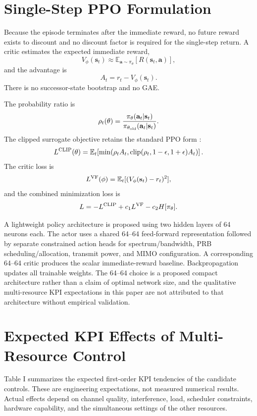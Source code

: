 \documentclass[conference]{IEEEtran}
\begin{document}
\section{Single-Step PPO Formulation}
Because the episode terminates after the immediate reward, no future reward exists to discount and no discount factor is required for the single-step return. A critic estimates the expected immediate reward,
\begin{equation}
V_\phi(\mathbf{s}_t)\approx
\mathbb{E}_{\mathbf{a}\sim\pi_\theta}
[R(\mathbf{s}_t,\mathbf{a})],
\end{equation}
and the advantage is
\begin{equation}
A_t=r_t-V_\phi(\mathbf{s}_t).
\end{equation}
There is no successor-state bootstrap and no GAE.

The probability ratio is
\begin{equation}
\rho_t(\theta)=
\frac{\pi_\theta(\mathbf{a}_t|\mathbf{s}_t)}
{\pi_{\theta_{\rm old}}(\mathbf{a}_t|\mathbf{s}_t)}.
\end{equation}
The clipped surrogate objective retains the standard PPO form \cite{ppo}:
\begin{equation}
L^{\rm CLIP}(\theta)=
\mathbb{E}_t\!\left[
\min\!\left(
\rho_tA_t,
\mathrm{clip}(\rho_t,1-\epsilon,1+\epsilon)A_t
\right)\right].
\end{equation}
The critic loss is
\begin{equation}
L^{\rm VF}(\phi)=
\mathbb{E}_t[(V_\phi(\mathbf{s}_t)-r_t)^2],
\end{equation}
and the combined minimization loss is
\begin{equation}
L=-L^{\rm CLIP}+c_1L^{\rm VF}-c_2H[\pi_\theta].
\end{equation}

A lightweight policy architecture is proposed using two hidden layers of 64 neurons each. The actor uses a shared 64--64 feed-forward representation followed by separate constrained action heads for spectrum/bandwidth, PRB scheduling/allocation, transmit power, and MIMO configuration. A corresponding 64--64 critic produces the scalar immediate-reward baseline. Backpropagation updates all trainable weights. The 64--64 choice is a proposed compact architecture rather than a claim of optimal network size, and the qualitative multi-resource KPI expectations in this paper are not attributed to that architecture without empirical validation.

\section{Expected KPI Effects of Multi-Resource Control}
Table I summarizes the expected first-order KPI tendencies of the candidate controls. These are engineering expectations, not measured numerical results. Actual effects depend on channel quality, interference, load, scheduler constraints, hardware capability, and the simultaneous settings of the other resources.
\end{document}
